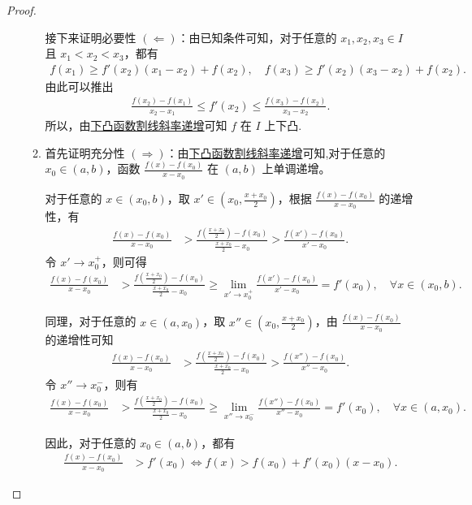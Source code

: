 \documentclass[../../main.tex]{subfiles}
\begin{document}
\begin{proof}
\begin{enumerate}
\begin{enumerate}[(1)]
接下来证明必要性 $(\Leftarrow)$：由已知条件可知，对于任意的 $x_1,x_2,x_3\in I$ 且 $x_1 < x_2 < x_3$，都有
\begin{align*}
f(x_1) \geqslant f'(x_2)(x_1 - x_2) + f(x_2),\quad f(x_3) \geqslant f'(x_2)(x_3 - x_2) + f(x_2).
\end{align*}
由此可以推出
\begin{align*}
\frac{f(x_2) - f(x_1)}{x_2 - x_1} \leqslant f'(x_2) \leqslant \frac{f(x_3) - f(x_2)}{x_3 - x_2}.
\end{align*}
所以，由\hyperref[下凸函数割线斜率递增]{下凸函数割线斜率递增}可知 $f$ 在 $I$ 上下凸.

\item 首先证明充分性 $(\Rightarrow)$：由\hyperref[下凸函数割线斜率递增]{下凸函数割线斜率递增}可知,对于任意的 $x_0\in (a,b)$，函数 $\frac{f(x) - f(x_0)}{x - x_0}$ 在 $(a,b)$ 上单调递增。

对于任意的 $x\in (x_0,b)$，取 $x'\in \left(x_0,\frac{x + x_0}{2}\right)$，根据 $\frac{f(x) - f(x_0)}{x - x_0}$ 的递增性，有
\begin{align*}
\frac{f(x) - f(x_0)}{x - x_0} &> \frac{f\left(\frac{x + x_0}{2}\right) - f(x_0)}{\frac{x + x_0}{2} - x_0} > \frac{f(x') - f(x_0)}{x' - x_0}.
\end{align*}
令 $x'\to x_0^+$，则可得
\begin{align*}
\frac{f(x) - f(x_0)}{x - x_0} &> \frac{f\left(\frac{x + x_0}{2}\right) - f(x_0)}{\frac{x + x_0}{2} - x_0} \geqslant \lim_{x'\to x_0^+}\frac{f(x') - f(x_0)}{x' - x_0}=f'(x_0),\quad \forall x\in (x_0,b).
\end{align*}

同理，对于任意的 $x\in (a,x_0)$，取 $x''\in \left(x_0,\frac{x + x_0}{2}\right)$，由 $\frac{f(x) - f(x_0)}{x - x_0}$ 的递增性可知
\begin{align*}
\frac{f(x) - f(x_0)}{x - x_0} &> \frac{f\left(\frac{x + x_0}{2}\right) - f(x_0)}{\frac{x + x_0}{2} - x_0} > \frac{f(x'') - f(x_0)}{x'' - x_0}.
\end{align*}
令 $x''\to x_0^-$，则有
\begin{align*}
\frac{f(x) - f(x_0)}{x - x_0} &> \frac{f\left(\frac{x + x_0}{2}\right) - f(x_0)}{\frac{x + x_0}{2} - x_0} \geqslant \lim_{x''\to x_0^-}\frac{f(x'') - f(x_0)}{x'' - x_0}=f'(x_0),\quad \forall x\in (a,x_0).
\end{align*}

因此，对于任意的 $x_0\in (a,b)$，都有
\begin{align*}
\frac{f(x) - f(x_0)}{x - x_0} &> f'(x_0) \Leftrightarrow f(x)>f(x_0)+f'(x_0)(x - x_0).
\end{align*}


\end{enumerate}
\end{enumerate}
\end{proof}
\end{document}
